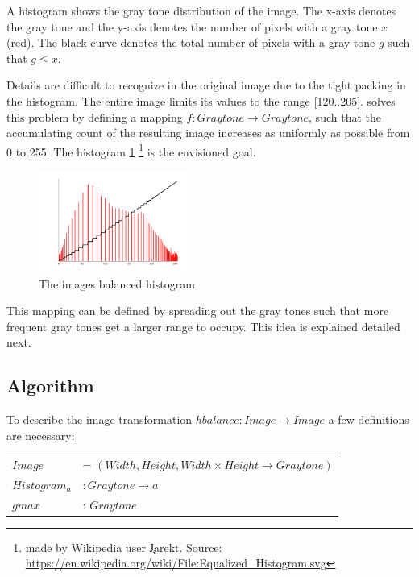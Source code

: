     A histogram shows the gray tone distribution of the image.
    The x-axis denotes the gray tone and the y-axis denotes the
    number of pixels with a gray tone $x$ (red). The black curve denotes the
    total number of pixels with a gray tone $g$ such that $g \leq x$.

    Details are difficult to recognize in the original image
    due to the tight packing in the histogram. The
    entire image limits its values to the range [120..205].
    \algo solves this problem by defining a mapping
    $f: Graytone \rightarrow Graytone$, such that the accumulating count
    of the resulting image increases as uniformly as possible from 0 to 255.
    The histogram \ref{fig:hist-eq}
    \footnote{made by Wikipedia user \c{Jarekt}. Source: \url{https://en.wikipedia.org/wiki/File:Equalized_Histogram.svg}}
    is the envisioned goal.
    
    \begin{figure}[h]
      \centering
      \includegraphics[width=0.45\textwidth]{hist-eq}
      \caption[Balanced Histogram]{The images balanced histogram}
      \label{fig:hist-eq}
    \end{figure}
    This mapping can be defined by spreading out the gray tones such that more
    frequent gray tones get a larger range to occupy. This idea is
    explained detailed next.
  \subsection*{Algorithm}
    To describe the image transformation $ hbalance: Image \rightarrow Image$ a few definitions are necessary:
    
    \begin{table}[h!]
    \label{table:hbaldefs}
    \centering
    \begin{tabular}{ll}
      $Image$ & = $(Width,Height,Width \times Height \rightarrow Graytone)$ \\
      $Histogram_a$ & $: Graytone \rightarrow a$ \\
      $gmax$ & : $Graytone$ \\
    \end{tabular}
    \end{table}
    
